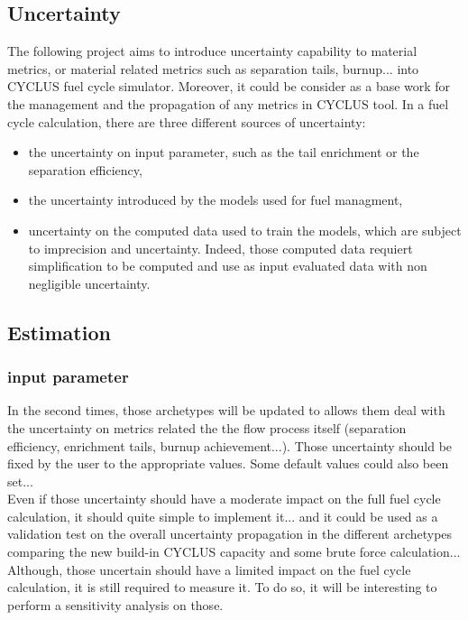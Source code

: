 \documentclass[dvips,12pt]{article}
\begin{document}
\subsection{Uncertainty}
The following project aims to introduce uncertainty capability to material metrics, or material related metrics such as separation tails, burnup...  into CYCLUS fuel cycle simulator. Moreover, it could be consider as a base work for the management and the propagation of any metrics in CYCLUS tool.
In a fuel cycle calculation, there are three different sources of uncertainty:
\begin{itemize}
\item the uncertainty on input parameter, such as the tail enrichment or the separation efficiency,
\item the uncertainty introduced by the models used for fuel managment,
\item uncertainty on the computed data used to train the models, which are subject to imprecision and uncertainty. Indeed, those computed data requiert simplification to be computed and use as input evaluated data with non negligible uncertainty.
\end{itemize}



\subsection{Estimation}
\subsubsection{input parameter}
In the second times, those archetypes will be updated to allows them deal with the uncertainty on metrics related the the flow process itself (separation efficiency, enrichment tails, burnup achievement...). Those uncertainty should be fixed by the user to the appropriate values. Some default values could also been set...\\
Even if those uncertainty should have a moderate impact on the full fuel cycle calculation, it should quite simple to implement it... and it could be used as a validation test on the overall uncertainty propagation in the different archetypes comparing the new build-in CYCLUS capacity and some brute force calculation...\\
Although, those uncertain should have a limited impact on the fuel cycle calculation, it is still required to measure it. To do so, it will be interesting to perform a sensitivity analysis on those.
\end{document}
